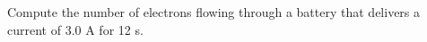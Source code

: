 Compute the number of electrons flowing through a battery 
that delivers a current of 3.0 A for 12 s.